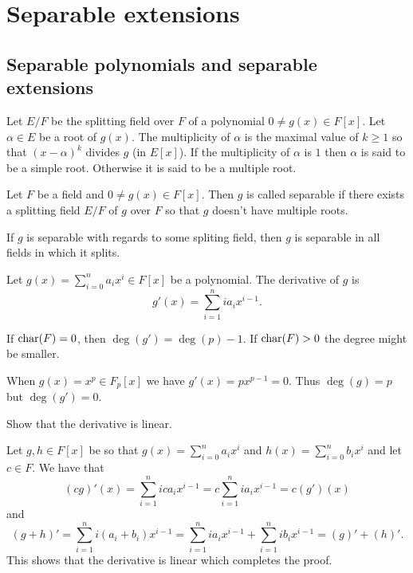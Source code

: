 \documentclass[11pt,a4paper]{article}
\begin{document}
\newpage

\section{Separable extensions}
\subsection{Separable polynomials and separable extensions}
\begin{definition}
  Let $E/F$ be the splitting field over $F$ of a polynomial
  $0 \neq g(x) \in F[x]$.
  Let $\alpha \in E$ be a root of $g(x)$.
  The multiplicity of $\alpha$ is the maximal value of $k \geq 1$
  so that $(x - \alpha)^k$ divides $g$ (in $E[x]$).
  If the multiplicity of $\alpha$ is $1$ then $\alpha$
  is said to be a simple root.
  Otherwise it is said to be a multiple root.
\end{definition}
\begin{definition}
  Let $F$ be a field and $0 \neq g(x) \in F[x]$.
  Then $g$ is called separable if there exists a splitting field $E/F$
  of $g$ over $F$ so that $g$ doesn't have multiple roots.
\end{definition}

\begin{remark}
  If $g$ is separable with regards to some spliting field,
  then $g$ is separable in all fields in which it splits.
\end{remark}

\begin{definition}[Derivative]
  Let $g(x) = \sum_{i=0}^{n} a_i x^i \in F[x]$ be a polynomial.
  The derivative of $g$ is
  \[
    g'(x) = \sum_{i=1}^{n} i a_i x^{i-1}.
  \]
\end{definition}

\begin{remark}
  If $\text{char}(F) = 0$,
  then $\deg(g') = \deg(p) - 1$.
  If $\text{char}(F) > 0$ the degree might be smaller.
\end{remark}

\begin{example}
  When $g(x) = x^p \in F_p[x]$ we have $g'(x) = p x^{p-1} = 0$.
  Thus $\deg(g) = p$ but $\deg(g') = 0$.
\end{example}

\begin{exercise}
  Show that the derivative is linear.
\end{exercise}
\begin{solution}
  Let $g,h \in F[x]$ be so that $g(x) = \sum_{i=0}^{n} a_i x^i$ and
  $h(x) = \sum_{i=0}^{n} b_i x^i$ and let $c \in F$.
  We have that
  \[
    (cg)'(x) =
    \sum_{i=1}^{n} i c a_i x^{i-1} =
    c \sum_{i=1}^{n} i a_i x^{i-1} =
    c(g')(x)
  \]
  and
  \[
    (g + h)' = 
    \sum_{i=1}^{n} i  (a_i + b_i) x^{i-1} =
    \sum_{i=1}^{n} i a_i x^{i-1} +
    \sum_{i=1}^{n} i b_i x^{i-1} =
    (g)' + (h)'.
  \]
  This shows that the derivative is linear which completes the proof.
\end{solution}
\end{document}
